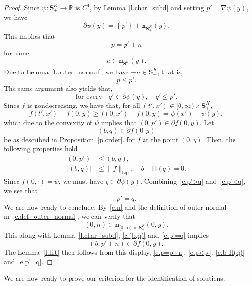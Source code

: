 \documentclass[10pt]{amsart}
\theoremstyle{definition}\newtheorem{defi}[theo]{Definition}\newtheorem{rema}[theo]{Remark}\newtheorem{exam}[theo]{Example}\newtheorem{exem}[theo]{Example}\newtheorem{nota}[theo]{Notation}
\newcommand{\R}{\mathbb{R}}
\renewcommand{\S}{\mathbf{S}}
\newcommand{\bfn}{\mathbf{n}}
\newcommand{\Lip}{\mathrm{Lip}}
\renewcommand{\H}{\mathsf{H}}
\renewcommand{\leq}{\leqslant}
\renewcommand{\geq}{\geqslant}
\begin{document}
\begin{proof}
Since $\psi:\S^K_+\to \R$ is $C^1$, by Lemma~\ref{l.char_subd} and setting $p' = \nabla \psi(y)$, we have
\[
\partial \psi(y) = \left\{p'\right\} + \bfn_{\S^K_+}(y).
\]
This implies that
\begin{equation}\label{e.p=p+n}
p = p' + n
\end{equation}
for some
\begin{equation}\label{e.n}
n \in \bfn_{\S^K_+}(y).
\end{equation}
Due to Lemma~\ref{l.outer_normal}, we have $-n \in \S^K_+$, that is,
\begin{equation}\label{e.p<p'}
p\leq p'.
\end{equation}
The same argument also yields that,
\begin{equation}\label{e.p'>q}
\text{for every}\quad q' \in \partial \psi(y), \quad q' \leq p'.
\end{equation}
Since $f$ is nondecreasing, we have that, for all $(t',x')\in[0,\infty)\times \S^K_+$,
\[
f\left(t',x'\right) - f(0,y)\geq f\left(0,x'\right)-f(0,y) = \psi(x') - \psi(y),
\]
which due to the convexity of $\psi$ implies that $(0,p')\in \partial f(0,y)$. Let
\begin{equation}\label{e.(b,q)}
(b,q) \in \partial f(0,y)
\end{equation}
be as described in Proposition~\ref{p.order}, for $f$ at the point $(0,y)$. Then, the following properties hold
\begin{align}
\left(0,p'\right) &\leq (b, q),\label{e.p'<q}
\\
\left|(b,q)\right| &\leq \|f\|_{\Lip},\quad b - \H(q)=0. \label{e.b-H(q)}
\end{align}
Since $f(0,\cdot) = \psi$, we must have $q \in \partial \psi(y)$. Combining~\eqref{e.p'>q} and~\eqref{e.p'<q}, we see that
\begin{equation}\label{e.p'=q}
p' = q.
\end{equation}
We are now ready to conclude. By~\eqref{e.n} and the definition of outer normal in~\eqref{e.def_outer_normal}, we can verify that
\[
(0,n) \in \bfn_{[0,\infty)\,\times\,\S^K_+}(0,y).
\]
This along with Lemma~\ref{l.char_subd}, \eqref{e.(b,q)} and~\eqref{e.p'=q} implies
\[
\left(b,p' + n\right) \in \partial f(0,y).
\]
The Lemma~\ref{l.lift} then follows from this display, \eqref{e.p=p+n}, \eqref{e.p<p'}, \eqref{e.b-H(q)} and~\eqref{e.p'=q}.
\end{proof}

We are now ready to prove our criterion for the identification of solutions.
\end{document}
